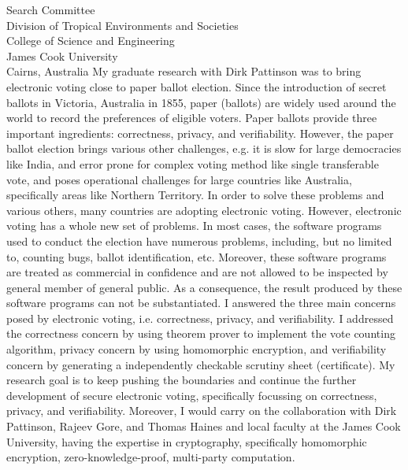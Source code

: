 \documentclass{letter}
\begin{document}
\begin{letter}{Search Committee\\
Division of Tropical Environments and Societies\\
College of Science and Engineering\\
James Cook University\\
Cairns, Australia}
My graduate research with Dirk Pattinson was to bring electronic voting close to 
paper ballot election.  Since the introduction of secret ballots in Victoria, Australia in 1855, 
paper (ballots) are widely used around the world to record 
the preferences of eligible voters. Paper ballots provide three 
important ingredients: correctness, privacy, and verifiability. 
However, the paper ballot election brings various  other challenges, e.g. 
it is slow for large democracies like India,  and error prone for complex voting method 
like single transferable vote, and poses operational challenges for 
large countries like Australia, specifically areas like Northern Territory. 
In order to solve these problems and various others, 
many countries are adopting electronic voting. However, 
electronic voting has a whole new set of problems. In most cases, the software 
programs used to conduct the election have numerous problems, including, but no limited to, 
counting bugs, ballot identification, etc. Moreover, 
these software programs are treated as commercial in confidence and 
are not allowed to be inspected by general member of general public. 
As a consequence, the result produced by these software programs 
can not be substantiated. I answered the three main concerns posed by electronic voting, i.e. 
correctness, privacy, and verifiability. I addressed the correctness concern by using 
theorem prover to implement the vote counting algorithm, 
privacy concern by using homomorphic encryption, and verifiability concern 
by generating a independently checkable scrutiny sheet (certificate). 
My research goal is to keep pushing  the boundaries and continue 
the further development of secure electronic voting, specifically focussing on correctness, privacy, and verifiability. 
Moreover, I would carry on the collaboration with Dirk Pattinson, Rajeev Gore, and Thomas Haines and 
local faculty at the James Cook University, having the 
expertise in cryptography, specifically homomorphic encryption, zero-knowledge-proof, multi-party computation.


\end{letter}
\end{document}
